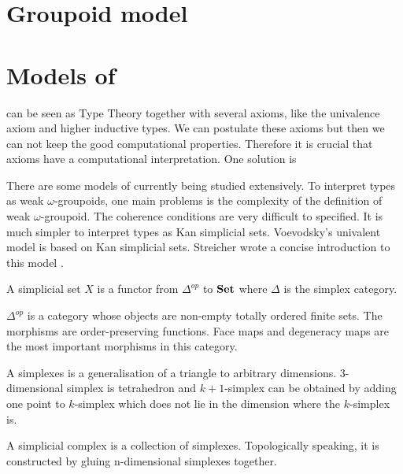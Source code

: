 \section{Groupoid model}




\section{Models of \hott}




\cite{bezem2013model}

\hott can be seen as Type Theory together with several axioms, like the univalence axiom and higher inductive types. We can postulate these axioms but then we can not keep the good computational properties. Therefore it is crucial that axioms have a computational interpretation. One solution is 









There are some models of \hott currently being studied extensively.
To interpret types as weak $\omega$-groupoids, one main problems is
the complexity of the definition of weak $\omega$-groupoid. The
coherence conditions are very difficult to specified.
It is much simpler to interpret types as Kan simplicial sets.
Voevodsky's univalent model\cite{klv:ssetmodel} is based on Kan simplicial sets. 
 Streicher wrote a concise introduction to this model \cite{DBLP:dblp_journals/japll/Streicher14}. 



\iffalse %

\begin{definition}
A simplicial set $X$ is a functor from $\Delta^{op}$ to $\operatorname{\mathbf{Set}}$ where
$\Delta$ is the simplex category.
\end{definition}

$\Delta^{op}$ is a category whose objects are non-empty totally ordered
finite sets. The morphisms are order-preserving functions. 
Face maps and degeneracy maps are the most important morphisms in this
category.

A simplexes is a generalisation of a triangle to arbitrary
dimensions. $3$-dimensional simplex is tetrahedron and $k+1$-simplex can
be obtained by adding one point to $k$-simplex which does not lie in the
dimension where the $k$-simplex is.

A simplicial complex is a collection of simplexes. Topologically speaking, it
is constructed by gluing n-dimensional simplexes together. 

